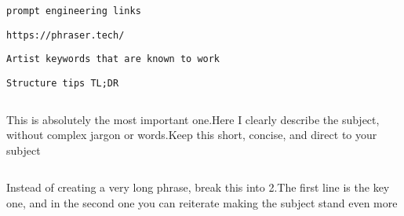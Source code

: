              

             
             
              \protect\hypertarget{ID_1700049962}{}{}

\begin{verbatim}
prompt engineering links
\end{verbatim}

               
               
                \protect\hypertarget{ID_604818194}{}{}

\begin{verbatim}
https://phraser.tech/
\end{verbatim}
               

               
               
                \protect\hypertarget{ID_1416043227}{}{}

\begin{verbatim}
Artist keywords that are known to work
\end{verbatim}
               

               
               
                \protect\hypertarget{ID_1262501593}{}{}

\begin{verbatim}
Structure tips TL;DR
\end{verbatim}

                 
                 
                  \protect\hypertarget{ID_404269802}{}{}

\begin{verbatim}
\end{verbatim}

                  This is absolutely the most important one.Here I
                  clearly describe the subject, without complex jargon
                  or words.Keep this short, concise, and direct to your
                  subject
                 

                 
                 
                  \protect\hypertarget{ID_1584864290}{}{}

\begin{verbatim}
\end{verbatim}

                  Instead of creating a very long phrase, break this
                  into 2.The first line is the key one, and in the
                  second one you can reiterate making the subject stand
                  even more
                 

